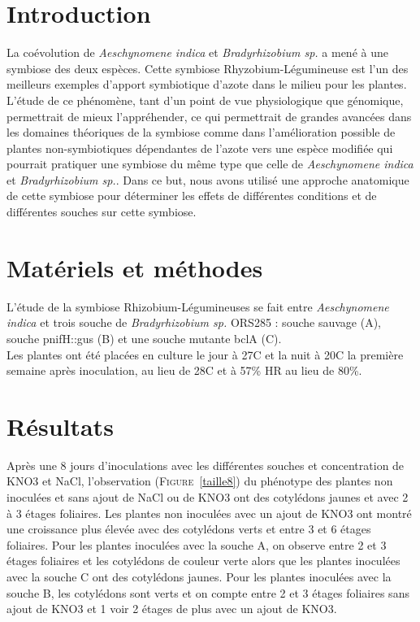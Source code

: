\documentclass[12pt,a4paper,onecolumn]{article}
\begin{document}
	\begin{multicols}{2}


		\section{Introduction}

			La coévolution de \textit{Aeschynomene indica} et \textit{Bradyrhizobium sp.} a mené à une symbiose des deux espèces. Cette symbiose Rhyzobium-Légumineuse est l'un des meilleurs exemples d'apport symbiotique d'azote dans le milieu pour les plantes. L'étude de ce phénomène, tant d'un point de vue physiologique que génomique, permettrait de mieux l'appréhender, ce qui permettrait de grandes avancées dans les domaines théoriques de la symbiose comme dans l'amélioration possible de plantes non-symbiotiques dépendantes de l'azote vers une espèce modifiée qui pourrait pratiquer une symbiose du même type que  celle de \textit{Aeschynomene indica} et \textit{Bradyrhizobium sp.}. Dans ce but, nous avons utilisé une approche anatomique de cette symbiose pour déterminer les effets de différentes conditions et de différentes souches sur cette symbiose.

		\section{Matériels et méthodes}

			L’étude de la symbiose Rhizobium-Légumineuses se fait entre \textit{Aeschynomene indica} et trois souche de \textit{Bradyrhizobium sp.} ORS285 : souche sauvage (A), souche pnifH::gus (B) et une souche mutante bclA (C).\\

			Les plantes ont été placées en culture le jour à 27\degre C et la nuit à 20\degre C la première semaine après inoculation, au lieu de 28\degre C et à 57\% HR au lieu de 80\%.


		\section{Résultats}

			Après une 8 jours d’inoculations avec les différentes souches et concentration de KNO3 et NaCl, l’observation (\textsc{Figure}~\ref{taille8}) du phénotype des plantes non inoculées et sans ajout de NaCl ou de KNO3 ont des cotylédons jaunes et avec 2 à 3 étages foliaires. Les plantes non inoculées avec un ajout de KNO3 ont montré une croissance plus élevée avec des cotylédons verts et entre 3 et 6 étages foliaires. Pour les plantes inoculées avec la souche A, on observe entre 2 et 3 étages foliaires et les cotylédons de couleur verte alors que les plantes inoculées avec la souche C ont des cotylédons jaunes. Pour les plantes inoculées avec la souche B, les cotylédons sont verts et on compte entre 2 et 3 étages foliaires sans ajout de KNO3 et 1 voir 2 étages de plus avec un ajout de KNO3.


\end{multicols}
\end{document}
